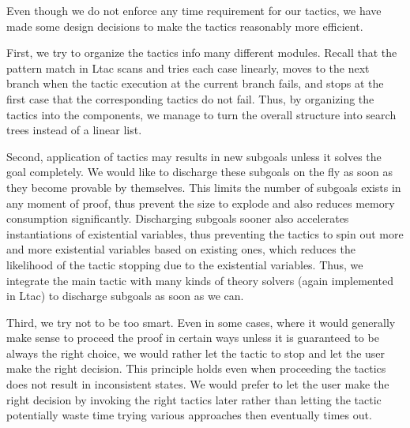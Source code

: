 Even though we do not enforce any time requirement for our tactics,
we have made some design decisions to make the tactics reasonably more
efficient.

First, we try to organize the tactics info many different modules.
Recall that the pattern match in Ltac scans and tries each case
linearly, moves to the next branch when the tactic execution
at the current branch fails, and stops at the first case that
the corresponding tactics do not fail. Thus, by organizing the
tactics into the components, we manage to turn the overall structure
into search trees instead of a linear list.

Second, application of tactics may results in new subgoals unless
it solves the goal completely. We would like to discharge these
subgoals on the fly as soon as they become provable by themselves.
This limits the number of subgoals exists in any moment of proof, thus
prevent the size to explode and also reduces memory consumption
significantly. Discharging subgoals sooner also accelerates instantiations
of existential variables, thus preventing the tactics to spin out
more and more existential variables based on existing ones, which
reduces the likelihood of the tactic stopping due to the existential
variables. Thus, we integrate the main tactic with many kinds of theory solvers
(again implemented in Ltac) to discharge subgoals as soon as we can.

Third, we try not to be too smart. Even in some cases, where it would generally
make sense to proceed the proof in certain ways unless it is guaranteed to
be always the right choice, we would rather let
the tactic to stop and let the user make the right decision. This principle
holds even when proceeding the tactics does not result in inconsistent states.
We would prefer to let the user make the right decision by invoking the right
tactics later rather than letting the tactic potentially waste time trying
various approaches then eventually times out.

